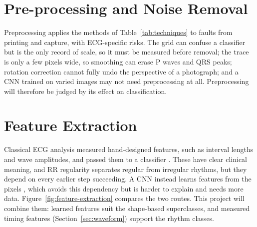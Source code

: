 \section{Pre-processing and Noise Removal}
\label{sec:preprocessing}

Preprocessing applies the methods of Table~\ref{tab:techniques} to faults from printing and capture, with ECG-specific risks. The grid can confuse a classifier but is the only record of scale, so it must be measured before removal; the trace is only a few pixels wide, so smoothing can erase P waves and QRS peaks; rotation correction cannot fully undo the perspective of a photograph; and a CNN trained on varied images may not need preprocessing at all. Preprocessing will therefore be judged by its effect on classification.

\section{Feature Extraction}
\label{sec:features}

Classical ECG analysis measured hand-designed features, such as interval lengths and wave amplitudes, and passed them to a classifier \cite{de_chazal_automatic_2004}. These have clear clinical meaning, and RR regularity separates regular from irregular rhythms, but they depend on every earlier step succeeding. A CNN instead learns features from the pixels \cite{lecun_deep_2015}, which avoids this dependency but is harder to explain and needs more data. Figure~\ref{fig:feature-extraction} compares the two routes. This project will combine them: learned features suit the shape-based superclasses, and measured timing features (Section~\ref{sec:waveform}) support the rhythm classes.

